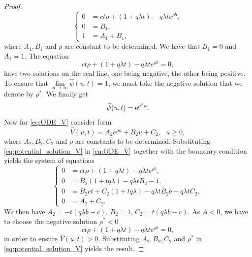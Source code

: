 \begin{proof}
\begin{equation*}
\begin{cases}
0&=ct\rho + \left(1+q\lambda t\right)-q\lambda te^{\rho b}, \\
0&=B_1, \\
1&= A_1+B_1,
\end{cases}
\end{equation*}
where $A_1, B_1$ and $\rho$ are constant to be determined. We have that $B_1 = 0$ and $A_1= 1$. 
The equation
\begin{equation*}
ct\rho + \left(1+q\lambda t\right)-q\lambda te^{\rho b} = 0,
\end{equation*}
have two solutions on the real line, one being negative, the other being positive. To ensure that $\underset{u\rightarrow \infty}{\lim}\widehat{\psi}(u,t) = 1$, we must take the negative solution that we denote by $\rho^\ast$. We finally get
\[
\widehat{\psi}(u,t) = \mathrm{e}^{\rho^{\ast} u}.
\]
Now for \eqref{eq:ODE_V} consider form
\begin{equation}\label{eq:potential_solution_V}
\widehat{V}(u,t) = A_2e^{\rho u }+B_2u + C_2,\text{ }u \ge 0, 
\end{equation}
where $A_2, B_2,C_2$ and $\rho$ are constants to be determined. Substituting \eqref{eq:potential_solution_V} in \eqref{eq:ODE_V} together with the boundary condition yields the system of equations 
\begin{equation*}
\begin{cases}
0&=ct\rho + \left(1+q\lambda t\right)-q\lambda te^{\rho b}, \\
0&= B_2\left(1+tq\lambda\right)-q\lambda tB_2 - 1,\\
0&=B_2ct+C_2(1+tq\lambda) - q\lambda t B_2b-q\lambda tC_2, \\
0&=A_2+C_2.
\end{cases}
\end{equation*}
We then have $A_2 = -t(q\lambda b - c)$, $B_2 = 1$, $C_2 = t(q\lambda b - c)$. As $A<0$, we have to choose the negative solution $\rho^\ast<0$ 
\begin{equation*}
ct\rho + \left(1+q\lambda t\right)-q\lambda te^{\rho b} = 0,
\end{equation*}
in order to ensure $\widehat{V}(u,t)>0$. Substituting $A_2,B_2,C_2$ and $\rho^{\ast}$ in \eqref{eq:potential_solution_V} yields the result.
\end{proof}
